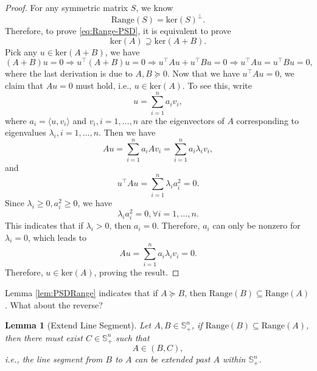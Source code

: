 \documentclass[
]{book}
\newtheorem{lemma}{Lemma}[chapter]
\theoremstyle{definition}
\theoremstyle{definition}
\theoremstyle{definition}
\theoremstyle{definition}
\theoremstyle{remark}
\begin{document}
\begin{proof}
For any symmetric matrix \(S\), we know
\[
\mathrm{Range}(S) = \mathrm{ker}(S)^{\perp}.
\]
Therefore, to prove \eqref{eq:Range-PSD}, it is equivalent to prove
\[
\mathrm{ker}(A) \supseteq \mathrm{ker}(A + B).
\]
Pick any \(u \in \mathrm{ker}(A + B)\), we have
\[
(A + B) u = 0 \Rightarrow u ^\top(A + B) u = 0 \Rightarrow u^\top A u + u^\top B u = 0 \Rightarrow u^\top A u = u^\top B u = 0,
\]
where the last derivation is due to \(A, B \succeq 0\). Now that we have \(u^\top A u = 0\), we claim that \(Au = 0\) must hold, i.e., \(u \in \mathrm{ker}(A)\). To see this, write
\[
u = \sum_{i=1}^n a_i v_i,
\]
where \(a_i = \langle u, v_i \rangle\) and \(v_i,i=1,\dots,n\) are the eigenvectors of \(A\) corresponding to eigenvalues \(\lambda_i,i=1,\dots,n\). Then we have
\[
Au = \sum_{i=1}^n a_i A v_i = \sum_{i=1}^n a_i \lambda_i v_i,
\]
and
\[
u^\top A u = \sum_{i=1}^n \lambda_i a_i^2 = 0.
\]
Since \(\lambda_i \geq 0, a_i^2 \geq 0\), we have
\[
\lambda_i a_i^2 = 0, \forall i = 1,\dots,n.
\]
This indicates that if \(\lambda_i > 0\), then \(a_i = 0\). Therefore, \(a_i\) can only be nonzero for \(\lambda_i = 0\), which leads to
\[
Au = \sum_{i=1}^n a_i \lambda_i v_i = 0.
\]
Therefore, \(u \in \mathrm{ker}(A)\), proving the result.
\end{proof}

Lemma \ref{lem:PSDRange} indicates that if \(A \succeq B\), then \(\mathrm{Range}(B) \subseteq \mathrm{Range}(A)\). What about the reverse?

\begin{lemma}[Extend Line Segment]
\protect\hypertarget{lem:Extension}{}\label{lem:Extension}Let \(A,B \in \mathbb{S}^{n}_{+}\), if \(\mathrm{Range}(B) \subseteq \mathrm{Range}(A)\), then there must exist \(C \in \mathbb{S}^{n}_{+}\) such that
\[
A \in (B,C),
\]
i.e., the line segment from \(B\) to \(A\) can be extended past \(A\) within \(\mathbb{S}^{n}_{+}\).
\end{lemma}
\end{document}
